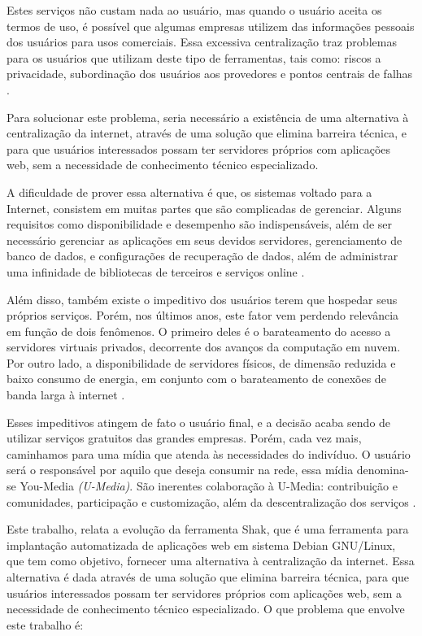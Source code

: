 Estes serviços não custam nada ao usuário, mas quando o usuário aceita os
termos de uso, é possível que algumas empresas utilizem das informações pessoais dos
usuários para usos comerciais. Essa excessiva centralização traz problemas para os usuários que utilizam deste tipo de ferramentas, tais como: riscos a privacidade, subordinação dos usuários
aos provedores e pontos centrais de falhas \cite{shak2015}. 

Para solucionar este problema, seria necessário a existência de uma alternativa à 
centralização da internet, através de uma solução que elimina barreira técnica, e 
para que usuários interessados possam ter servidores próprios com aplicações web, 
sem a necessidade de conhecimento técnico especializado.

A dificuldade de prover essa alternativa é que, os sistemas voltado para a
Internet, consistem em muitas partes que são complicadas de gerenciar. Alguns
requisitos como disponibilidade e desempenho são indispensáveis, além de ser
necessário gerenciar as aplicações em seus devidos servidores, gerenciamento de
banco de dados, e configurações de recuperação de dados, além de administrar uma
infinidade de bibliotecas de terceiros e serviços online \cite{6265084}.

Além disso, também existe o impeditivo dos usuários terem que hospedar seus próprios serviços. Porém, nos últimos anos, este fator vem perdendo relevância em função de
dois fenômenos. O primeiro deles é o barateamento do acesso a servidores virtuais
privados, decorrente dos avanços da computação em nuvem. Por outro lado, a
disponibilidade de servidores físicos, de dimensão reduzida e baixo consumo de
energia, em conjunto com o barateamento de conexões de banda larga à internet \cite{shak2015}.

Esses impeditivos atingem de fato o usuário final, e a decisão
acaba sendo de utilizar serviços gratuitos das grandes empresas. Porém, 
cada vez mais, caminhamos para uma mídia que atenda às necessidades do indivíduo. 
O usuário será o responsável por aquilo que deseja consumir na rede, essa mídia 
denomina-se You-Media \textit{(U-Media)}. São inerentes colaboração à U-Media: contribuição 
e comunidades, participação e customização, além da descentralização dos 
serviços \cite{terra2006comunicaccao}. 

Este trabalho, relata a evolução da ferramenta Shak, que é uma ferramenta para implantação
automatizada de aplicações web em sistema Debian GNU/Linux, que tem como objetivo, fornecer
uma alternativa à centralização da internet. Essa alternativa é dada através de 
uma solução que elimina barreira técnica, para que usuários interessados possam 
ter servidores próprios com aplicações web, sem a necessidade de conhecimento técnico 
especializado. O que problema que envolve este trabalho é:

